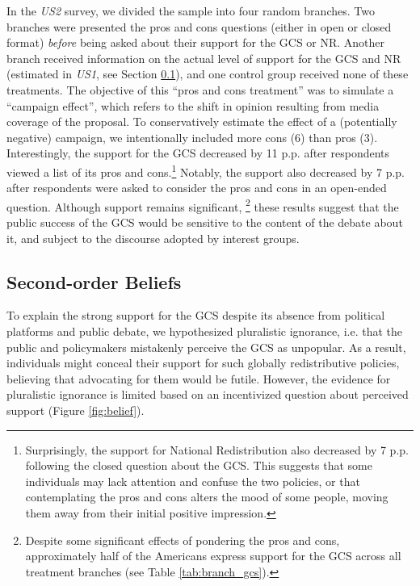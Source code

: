 In the \textit{US2} survey, we divided the sample into four random branches. 
Two branches were presented the pros and cons questions (either in open or closed format) \textit{before} being asked about their support for the GCS or NR. Another branch received information on the actual level of support for the GCS and NR (estimated in \textit{US1}, see Section \ref{subsec:second_order_beliefs}), and one control group received none of these treatments. %
The objective of this ``pros and cons treatment'' was to simulate a ``campaign effect'', which refers to the shift in opinion resulting from media coverage of the proposal. To conservatively estimate the effect of a (potentially negative) campaign, we intentionally included more cons (6) than pros (3). Interestingly, the support for the GCS decreased by 11 p.p. after respondents viewed a list of its pros and cons.\footnote{Surprisingly, the support for National Redistribution also decreased by 7 p.p. following the closed question about the GCS. This suggests that some individuals may lack attention and confuse the two policies, or that contemplating the pros and cons alters the mood of some people, moving them away from their initial positive impression.} Notably, the support also decreased by 7 p.p. after respondents were asked to consider the pros and cons in an open-ended question. Although support remains significant,%
\footnote{Despite some significant effects of pondering the pros and cons, approximately half of the Americans express support for the GCS across all treatment branches (see Table \ref{tab:branch_gcs}).} 
these results suggest that the public success of the GCS would be sensitive to the content of the debate about it, and subject to the discourse adopted by interest groups. %

\subsection{Second-order Beliefs}\label{subsec:second_order_beliefs}
To explain the strong support for the GCS despite its absence from political platforms and public debate, 
we hypothesized pluralistic ignorance, i.e. that the public and policymakers mistakenly perceive the GCS as unpopular. As a result, individuals might conceal their support for such globally redistributive policies, believing that advocating for them would be futile. 
However, the evidence for pluralistic ignorance is limited based on an incentivized question about perceived support (Figure \ref{fig:belief}).

